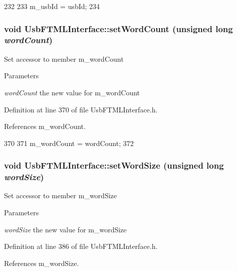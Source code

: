 \begin{DoxyCode}
232                             {
233     m_usbId = usbId;
234   }
\end{DoxyCode}
\hypertarget{classUsbFTMLInterface_a3061389b73d2c2be1d53007723f9280e}{
\subsubsection[{setWordCount}]{\setlength{\rightskip}{0pt plus 5cm}void UsbFTMLInterface::setWordCount (unsigned long {\em wordCount})}}
\label{classUsbFTMLInterface_a3061389b73d2c2be1d53007723f9280e}
Set accessor to member m\_\-wordCount 
\begin{DoxyParams}{Parameters}
\item[{\em wordCount}]the new value for m\_\-wordCount \end{DoxyParams}


Definition at line 370 of file UsbFTMLInterface.h.

References m\_\-wordCount.


\begin{DoxyCode}
370                                               {
371     m_wordCount = wordCount;
372   }
\end{DoxyCode}
\hypertarget{classUsbFTMLInterface_a8f54e893ac36ae74bd4702ae649b79dd}{
\subsubsection[{setWordSize}]{\setlength{\rightskip}{0pt plus 5cm}void UsbFTMLInterface::setWordSize (unsigned long {\em wordSize})}}
\label{classUsbFTMLInterface_a8f54e893ac36ae74bd4702ae649b79dd}
Set accessor to member m\_\-wordSize 
\begin{DoxyParams}{Parameters}
\item[{\em wordSize}]the new value for m\_\-wordSize \end{DoxyParams}


Definition at line 386 of file UsbFTMLInterface.h.

References m\_\-wordSize.

